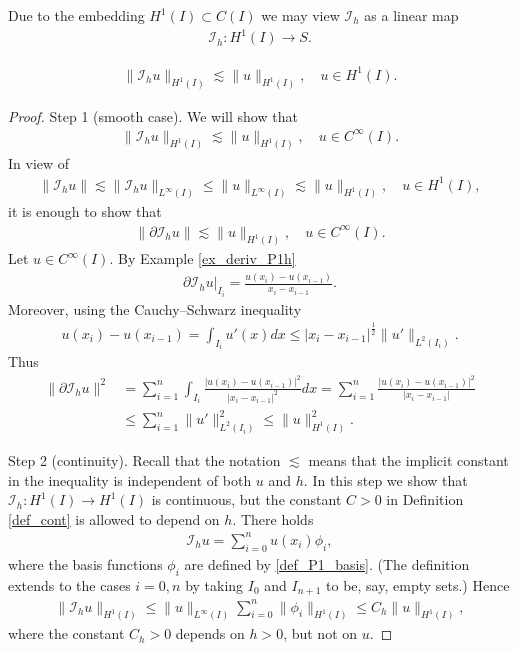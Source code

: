 \documentclass[12pt,oneside,final]{amsart}
\def\p{\partial}
\def\I{\mathcal I}
\begin{document}
Due to the embedding $H^1(I) \subset C(I)$ we may view $\I_h$ as a linear map 
    \begin{align*}
\I_h : H^1(I) \to S.
    \end{align*}

\begin{theorem}
    \begin{align*}
\|\I_h u\|_{H^1(I)} \lesssim \|u\|_{H^1(I)},
\quad u \in H^1(I).
    \end{align*}
\end{theorem}
\begin{proof} 
Step 1 (smooth case).
We will show that 
    \begin{align}\label{eq_Ih_cont_pre}
\|\I_h u\|_{H^1(I)} \lesssim \|u\|_{H^1(I)},
\quad u \in C^\infty(I).
    \end{align}
In view of
    \begin{align}\label{eq_Ih_L2_cont}
\|\I_h u\| \lesssim \|\I_h u\|_{L^\infty(I)}
\le \|u\|_{L^\infty(I)} \lesssim \|u\|_{H^1(I)}, \quad u \in H^1(I),
    \end{align}
it is enough to show that
    \begin{align*}
\|\p \I_h u\| \lesssim \|u\|_{H^1(I)},
\quad u \in C^\infty(I).
    \end{align*}
Let $u \in C^\infty(I)$. 
By Example \ref{ex_deriv_P1h}
    \begin{align*}
\p \I_h u|_{I_i} = \frac{u(x_i) - u(x_{i-1})}{x_i - x_{i-1}}.
    \end{align*}
Moreover, using the Cauchy--Schwarz inequality
    \begin{align*}
u(x_i) - u(x_{i-1}) = \int_{I_i} u'(x) dx \le |x_i - x_{i-1}|^{\frac12} \|u'\|_{L^2(I_i)}.
    \end{align*}
Thus
    \begin{align*}
\|\p \I_h u\|^2 
&= 
\sum_{i=1}^n \int_{I_i} 
\frac{|u(x_i) - u(x_{i-1})|^2}{|x_i - x_{i-1}|^2} dx
= 
\sum_{i=1}^n \frac{|u(x_i) - u(x_{i-1})|^2}{|x_i - x_{i-1}|}
\\&\le 
\sum_{i=1}^n \|u'\|_{L^2(I_i)}^2 \le \|u\|_{H^1(I)}^2.
    \end{align*}

Step 2 (continuity).
Recall that the notation $\lesssim$ means that the implicit constant in the inequality is independent of both $u$ and $h$.
In this step we show that $\I_h : H^1(I) \to H^1(I)$ is continuous, but the constant $C > 0$ in Definition \ref{def_cont} is allowed to depend on $h$. There holds 
    \begin{align*}
\I_h u = \sum_{i=0}^n u(x_i) \phi_i,
    \end{align*}
where the basis functions $\phi_i$ are defined by \eqref{def_P1_basis}. (The definition extends to the cases $i=0,n$ by taking $I_0$ and $I_{n+1}$ to be, say,  empty sets.) 
Hence
    \begin{align*}
\|\I_h u\|_{H^1(I)} \le \|u\|_{L^\infty(I)} \sum_{i=0}^n \|\phi_i\|_{H^1(I)}
\le C_h \|u\|_{H^1(I)},
    \end{align*}
where the constant $C_h > 0$ depends on $h > 0$, but not on $u$.


\end{proof}
\end{document}
